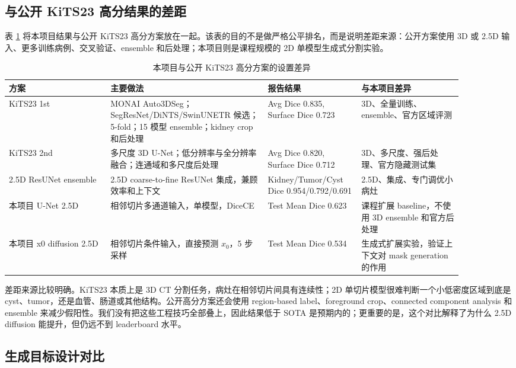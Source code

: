 \documentclass[lang=cn,11pt,a4paper]{elegantpaper}
\begin{document}
\subsection{与公开 KiTS23 高分结果的差距}

表 \ref{tab:sota_gap} 将本项目结果与公开 KiTS23 高分方案放在一起。该表的目的不是做严格公平排名，而是说明差距来源：公开方案使用 3D 或 2.5D 输入、更多训练病例、交叉验证、ensemble 和后处理；本项目则是课程规模的 2D 单模型生成式分割实验。

\begin{table}[H]
\centering
\caption{本项目与公开 KiTS23 高分方案的设置差异}
\label{tab:sota_gap}
\begin{tabular}{p{0.20\linewidth}p{0.31\linewidth}p{0.18\linewidth}p{0.20\linewidth}}
\toprule
方案 & 主要做法 & 报告结果 & 与本项目差异 \\
\midrule
KiTS23 1st \cite{myronenko2023kits23} & MONAI Auto3DSeg；SegResNet/DiNTS/SwinUNETR 候选；5-fold；15 模型 ensemble；kidney crop 和后处理 & Avg Dice 0.835, Surface Dice 0.723 & 3D、全量训练、ensemble、官方区域评测 \\
KiTS23 2nd \cite{uhm2023kits23} & 多尺度 3D U-Net；低分辨率与全分辨率融合；连通域和多尺度后处理 & Avg Dice 0.820, Surface Dice 0.712 & 3D、多尺度、强后处理、官方隐藏测试集 \\
2.5D ResUNet ensemble \cite{chen2023kits23} & 2.5D coarse-to-fine ResUNet 集成，兼顾效率和上下文 & Kidney/Tumor/Cyst Dice 0.954/0.792/0.691 & 2.5D、集成、专门调优小病灶 \\
本项目 U-Net 2.5D & 相邻切片多通道输入，单模型，DiceCE & Test Mean Dice 0.623 & 课程扩展 baseline，不使用 3D ensemble 和官方后处理 \\
本项目 x0 diffusion 2.5D & 相邻切片条件输入，直接预测 $x_0$，5 步采样 & Test Mean Dice 0.534 & 生成式扩展实验，验证上下文对 mask generation 的作用 \\
\bottomrule
\end{tabular}
\end{table}

差距来源比较明确。KiTS23 本质上是 3D CT 分割任务，病灶在相邻切片间具有连续性；2D 单切片模型很难判断一个小低密度区域到底是 cyst、tumor，还是血管、肠道或其他结构。公开高分方案还会使用 region-based label、foreground crop、connected component analysis 和 ensemble 来减少假阳性。我们没有把这些工程技巧全部叠上，因此结果低于 SOTA 是预期内的；更重要的是，这个对比解释了为什么 2.5D diffusion 能提升，但仍远不到 leaderboard 水平。

\subsection{生成目标设计对比}
\end{document}
